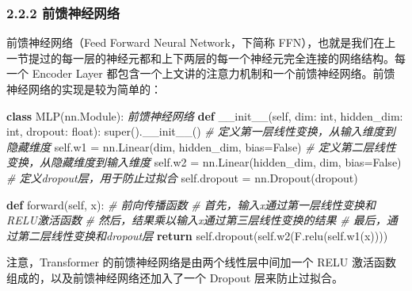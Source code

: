 \documentclass[
]{article}
\newenvironment{Shaded}{}{}
\newcommand{\BuiltInTok}[1]{\textcolor[rgb]{0.00,0.50,0.00}{#1}}
\newcommand{\CommentTok}[1]{\textcolor[rgb]{0.38,0.63,0.69}{\textit{#1}}}
\newcommand{\ControlFlowTok}[1]{\textcolor[rgb]{0.00,0.44,0.13}{\textbf{#1}}}
\newcommand{\FunctionTok}[1]{\textcolor[rgb]{0.02,0.16,0.49}{#1}}
\newcommand{\KeywordTok}[1]{\textcolor[rgb]{0.00,0.44,0.13}{\textbf{#1}}}
\newcommand{\NormalTok}[1]{#1}
\newcommand{\OperatorTok}[1]{\textcolor[rgb]{0.40,0.40,0.40}{#1}}
\newcommand{\VariableTok}[1]{\textcolor[rgb]{0.10,0.09,0.49}{#1}}
\begin{document}
\subsubsection{2.2.2
前馈神经网络}\label{ux524dux9988ux795eux7ecfux7f51ux7edc}

前馈神经网络（Feed Forward Neural Network，下简称
FFN），也就是我们在上一节提过的每一层的神经元都和上下两层的每一个神经元完全连接的网络结构。每一个
Encoder Layer
都包含一个上文讲的注意力机制和一个前馈神经网络。前馈神经网络的实现是较为简单的：

\begin{Shaded}
\begin{Highlighting}[]
\KeywordTok{class}\NormalTok{ MLP(nn.Module):}
    \CommentTok{\textquotesingle{}\textquotesingle{}\textquotesingle{}前馈神经网络\textquotesingle{}\textquotesingle{}\textquotesingle{}}
    \KeywordTok{def} \FunctionTok{\_\_init\_\_}\NormalTok{(}\VariableTok{self}\NormalTok{, dim: }\BuiltInTok{int}\NormalTok{, hidden\_dim: }\BuiltInTok{int}\NormalTok{, dropout: }\BuiltInTok{float}\NormalTok{):}
        \BuiltInTok{super}\NormalTok{().}\FunctionTok{\_\_init\_\_}\NormalTok{()}
        \CommentTok{\# 定义第一层线性变换，从输入维度到隐藏维度}
        \VariableTok{self}\NormalTok{.w1 }\OperatorTok{=}\NormalTok{ nn.Linear(dim, hidden\_dim, bias}\OperatorTok{=}\VariableTok{False}\NormalTok{)}
        \CommentTok{\# 定义第二层线性变换，从隐藏维度到输入维度}
        \VariableTok{self}\NormalTok{.w2 }\OperatorTok{=}\NormalTok{ nn.Linear(hidden\_dim, dim, bias}\OperatorTok{=}\VariableTok{False}\NormalTok{)}
        \CommentTok{\# 定义dropout层，用于防止过拟合}
        \VariableTok{self}\NormalTok{.dropout }\OperatorTok{=}\NormalTok{ nn.Dropout(dropout)}

    \KeywordTok{def}\NormalTok{ forward(}\VariableTok{self}\NormalTok{, x):}
        \CommentTok{\# 前向传播函数}
        \CommentTok{\# 首先，输入x通过第一层线性变换和RELU激活函数}
        \CommentTok{\# 然后，结果乘以输入x通过第三层线性变换的结果}
        \CommentTok{\# 最后，通过第二层线性变换和dropout层}
        \ControlFlowTok{return} \VariableTok{self}\NormalTok{.dropout(}\VariableTok{self}\NormalTok{.w2(F.relu(}\VariableTok{self}\NormalTok{.w1(x))))}
    
\end{Highlighting}
\end{Shaded}

注意，Transformer 的前馈神经网络是由两个线性层中间加一个 RELU
激活函数组成的，以及前馈神经网络还加入了一个 Dropout 层来防止过拟合。
\end{document}

